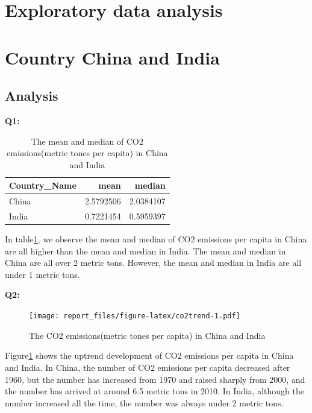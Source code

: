\documentclass[11pt,a4paper,]{article}
\begin{document}
\clearpage

\hypertarget{exploratory-data-analysis}{%
\section{Exploratory data analysis}\label{exploratory-data-analysis}}

\section*{Country China and India}

\subsection*{Analysis}

\textbf{Q1:}

\begin{table}

\caption{\label{tab:co2table}The mean and median of CO2 emissions(metric tones per capita) in China and India }
\centering
\begin{tabular}[t]{l|r|r}
\hline
Country\_Name & mean & median\\
\hline
China & 2.5792506 & 2.0384107\\
\hline
India & 0.7221454 & 0.5959397\\
\hline
\end{tabular}
\end{table}

In table\ref{tab:co2table}, we observe the mean and median of CO2 emissions per capita in China are all higher than the mean and median in India. The mean and median in China are all over 2 metric tons. However, the mean and median in India are all under 1 metric tons.

\textbf{Q2:}

\begin{figure}
\centering
\texttt{[image: report\_files/figure-latex/co2trend-1.pdf]}
\caption{\label{fig:co2trend}The CO2 emissions(metric tones per capita) in China and India}
\end{figure}

Figure\ref{fig:co2trend} shows the uptrend development of CO2 emissions per capita in China and India. In China, the number of CO2 emissions per capita decreased after 1960, but the number has increased from 1970 and raised sharply from 2000, and the number has arrived at around 6.5 metric tons in 2010. In India, although the number increased all the time, the number was always under 2 metric tons.
\end{document}
